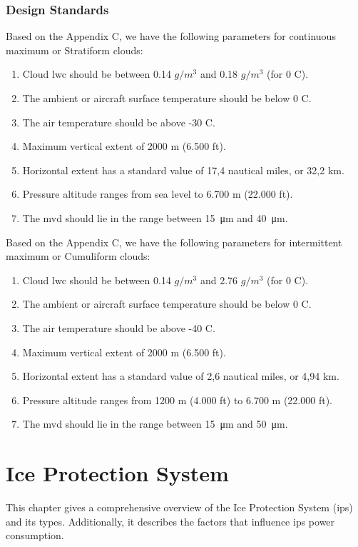 \documentclass[english]{kththesis}
\begin{document}
\subsection{Design Standards}
\label{subsec:desnstd}
Based on the Appendix C, we have the following parameters for continuous maximum or Stratiform clouds:
\begin{enumerate}
\item Cloud \acrshort{lwc}  should be between 0.14 $g/m^3$ and 0.18 $g/m^3$ (for 0 \degree C).
\item The ambient or aircraft surface temperature should be below 0 \degree C.
\item The air temperature should be above -30 \degree C.
\item Maximum vertical extent of 2000 m (6.500 ft).
\item Horizontal extent has a standard value of 17,4 nautical miles, or 32,2 km.
\item Pressure altitude ranges from sea level to 6.700 m (22.000 ft).
\item The \acrshort{mvd} should lie in the range between \SI{15}{\micro\metre} and \SI{40}{\micro\metre}.
\end{enumerate}

Based on the Appendix C, we have the following parameters for intermittent maximum or Cumuliform clouds:
\begin{enumerate}
\item Cloud \acrshort{lwc}  should be between 0.14 $g/m^3$ and 2.76 $g/m^3$ (for 0 \degree C).
\item The ambient or aircraft surface temperature should be below 0 \degree C.
\item The air temperature should be above -40 \degree C.
\item Maximum vertical extent of 2000 m (6.500 ft).
\item Horizontal extent has a standard value of 2,6 nautical miles, or 4,94 km.
\item Pressure altitude ranges from 1200 m (4.000 ft) to 6.700 m (22.000 ft).
\item The \acrshort{mvd} should lie in the range between \SI{15}{\micro\metre} and \SI{50}{\micro\metre}.
\end{enumerate}
\clearpage

\chapter{Ice Protection System}
\label{ch:IPS}
This chapter gives a comprehensive overview of the Ice Protection System (\acrshort{ips}) and its types. Additionally, it describes the factors that influence \acrshort{ips} power consumption.
\end{document}
